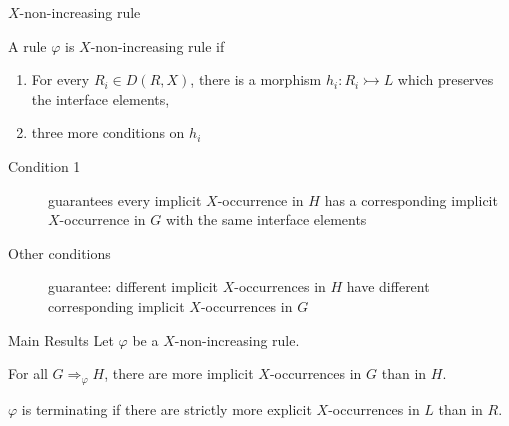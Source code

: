 \documentclass{beamer}
\begin{document}
\begin{frame}{$X$-non-increasing rule}
 \begin{definition}
    A rule $\varphi$ is $X$-non-increasing rule if 
    \begin{enumerate}
        \item For every $R_i \in D(R,X)$, there is a morphism \(h_i: R_i \rightarrowtail L \) which preserves the interface elements,
        \item three more conditions on $h_i$
    \end{enumerate}  
 \end{definition}

    \begin{description}
    \item[Condition 1] guarantees every implicit $X$-occurrence in $H$ has a corresponding implicit $X$-occurrence in $G$ with the same interface elements

        \item[Other conditions] guarantee: different implicit $X$-occurrences in $H$ have different corresponding implicit $X$-occurrences in $G$
\end{description} 
\end{frame}

\begin{frame}{Main Results}
    Let $\varphi$ be a $X$-non-increasing rule.
    \begin{lemma}
        For all $G \Rightarrow_\varphi H$, there are more implicit $X$-occurrences in $G$ than in $H$.
    \end{lemma}
         
    \begin{theorem}
        $\varphi$ is terminating if there are strictly more explicit $X$-occurrences in $L$ than in $R$.
    \end{theorem}

\end{frame}
\end{document}
